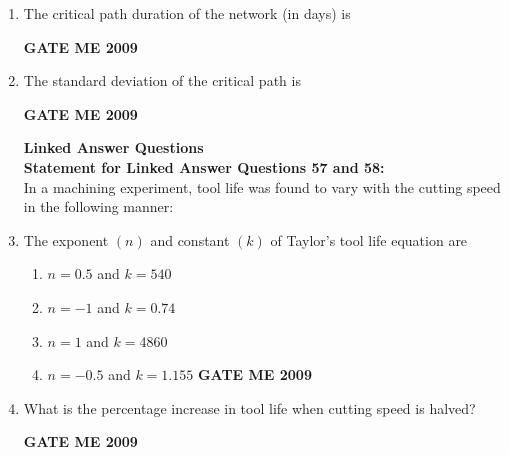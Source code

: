 \documentclass[journal]{IEEEtran}
\begin{document}
\begin{enumerate}[leftmargin=0pt]
\begin{table}[h]
\end{table}
\newpage


\item The critical path duration of the network (in days) is
\begin{enumerate}
\hfill{\textbf{GATE ME 2009}}
\end{enumerate}
\item The standard deviation of the critical path is
\begin{enumerate}
\hfill{\textbf{GATE ME 2009}}
\end{enumerate}

\textbf{Linked Answer Questions}\\
\textbf{Statement for Linked Answer Questions 57 and 58:}\\
In a machining experiment, tool life was found to vary with the cutting speed in the following manner:
\begin{table}[h]
    \centering
    
   
\end{table}

\item The exponent $(n)$ and constant $(k)$ of Taylor's tool life equation are
\begin{enumerate}
  \item $n=0.5$ and $k=540$
  \item $n=-1$ and $k=0.74$
  \item $n=1$ and $k=4860$
  \item $n=-0.5$ and $k=1.155$
\hfill{\textbf{GATE ME 2009}}
\end{enumerate}

\item What is the percentage increase in tool life when cutting speed is halved?
\begin{enumerate}
\hfill{\textbf{GATE ME 2009}}
\end{enumerate}


\end{enumerate}
\end{document}
